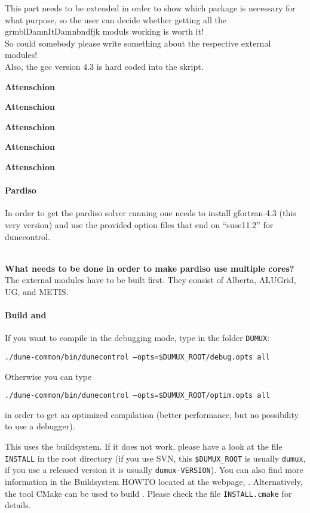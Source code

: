 {\it

  This  part needs to be extended in order to show which package is necessary for what purpose, 
  so the user can decide whether getting all the grmblDamnItDamnbndfjk 
  moduls working is worth it! \\

  So could somebody please write something about the respective external modules!\\ 

Also, the gcc version 4.3 is hard coded into the skript. }

\begin{turn}{45}\textbf{Attenschion}\end{turn}
\begin{turn}{45}\textbf{Attenschion}\end{turn}
\begin{turn}{45}\textbf{Attenschion}\end{turn}
\begin{turn}{45}\textbf{Attenschion}\end{turn}
\begin{turn}{45}\textbf{Attenschion}\end{turn}

\paragraph{Pardiso} 
In order to get the pardiso solver running one needs to install gfortran-4.3 (this very version) and use the provided option files that end on ``suse11.2'' for dunecontrol. 

\\
\textbf{What needs to be done in order to make pardiso use multiple cores?}\\

The external modules have to be built first. They consist of Alberta, ALUGrid, UG, and METIS.

\paragraph{Build \Dune and \Dumux}
\label{buildIt}
If you want to compile in the debugging mode, type in the folder \texttt{DUMUX}: 
\begin{center}
\texttt{./dune-common/bin/dunecontrol --opts=\$DUMUX\_ROOT/debug.opts all}
\end{center}

Otherwise you can type
\begin{center}
\texttt{./dune-common/bin/dunecontrol --opts=\$DUMUX\_ROOT/optim.opts all}
\end{center}
in order to get an optimized compilation (better performance, but no possibility to use a debugger).

This uses the \Dune buildsystem. If it does not work, please have a look at the file \texttt{INSTALL} in the \Dumux root directory (if you use SVN, this \texttt{\$DUMUX\_ROOT} is usually \texttt{dumux}, if you use a released version it is usually \texttt{dumux-VERSION}). You can also find more information in the \Dune Buildsystem HOWTO located at the \Dune webpage, \cite{DUNE-HP}.  Alternatively, the tool CMake can be used to build \Dumux. Please check the file \texttt{INSTALL.cmake} for details.
